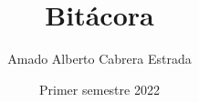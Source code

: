 \documentclass[spanish,code,tables]{HomeWork}
\institute{Laboratorio de investigación}
\title{Bitácora}
\author{Amado Alberto Cabrera Estrada}
\date{Primer semestre 2022}
\begin{document}
{{  }}


\end{document}
